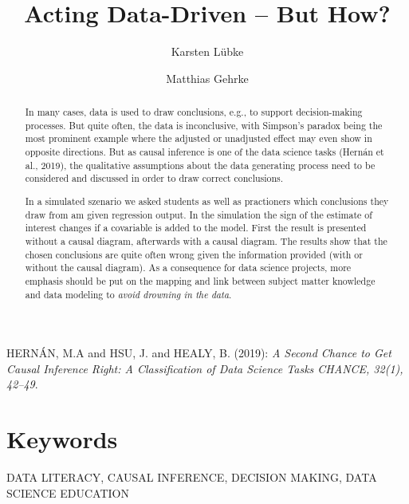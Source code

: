 \documentclass{svmult}
\begin{document}
\title*{Acting Data-Driven -- But How?}

\author{Karsten L\"{u}bke\and
Matthias Gehrke}
\maketitle

\begin{abstract}
In many cases, data is used to draw conclusions, e.g., to support decision-making processes.
But quite often, the data is inconclusive, with Simpson's paradox being the most prominent example where the adjusted or unadjusted effect may even show in opposite directions.
But as causal inference is one of the data science tasks (Hern\'{a}n et al., 2019), the qualitative assumptions about the data generating process need to be considered and discussed in order to draw correct conclusions.

In a simulated szenario we asked students as well as practioners which conclusions they draw from am given regression output. In the simulation the sign of the estimate of interest changes if a covariable is added to the model.
First the result is presented without a causal diagram, afterwards with a causal diagram. 
The results show that the chosen conclusions are quite often wrong given the information provided (with or without the causal diagram). 
As a consequence for data science projects, more emphasis should be put on the mapping and link between subject matter knowledge and data modeling to {\em avoid drowning in the data}.


\end{abstract}

\begin{thebibliography}{1}

\item[]
HERN\'{A}N, M.A and HSU, J. and  HEALY, B. (2019): {\em A Second Chance to Get
Causal Inference Right: A Classification of Data Science Tasks CHANCE, 32(1), 42--49}. 

\end{thebibliography}

\section*{Keywords}
DATA LITERACY, CAUSAL INFERENCE, DECISION MAKING, DATA SCIENCE EDUCATION 
\end{document}
